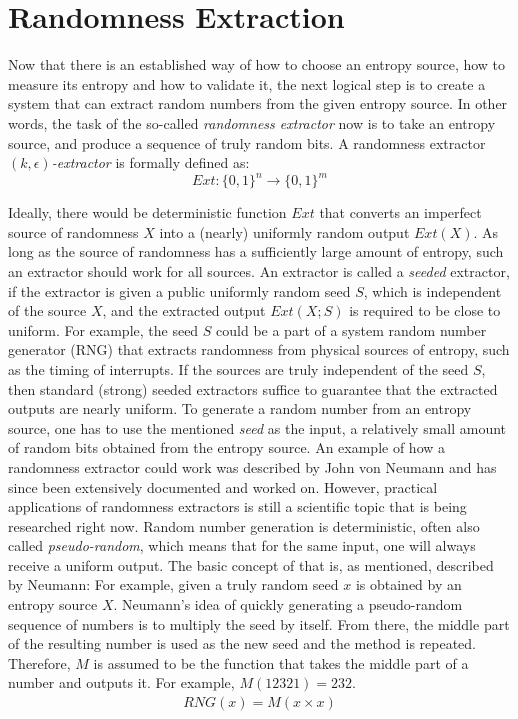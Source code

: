 \section{Randomness Extraction}
Now that there is an established way of how to choose an entropy source, how to measure its entropy and how to validate it, the next logical step is to create a system that can extract random numbers from the given entropy source.
In other words, the task of the so-called \emph{randomness extractor} now is to take an entropy source, and produce a sequence of truly random bits.
\newline
A randomness extractor $(k,\epsilon)$\emph{-extractor} is formally defined as:
\begin{equation}
    Ext: \{0, 1\}^n \to \{0,1\}^m
\end{equation}

\noindent
Ideally, there would be deterministic function $Ext$ that converts an imperfect source of randomness $X$ into a (nearly) uniformly random output $Ext(X)$.
As long as the source of randomness has a sufficiently large amount of entropy, such an extractor should work for all sources.
\newline
An extractor is called a \emph{seeded} extractor, if the extractor is given a public uniformly random seed $S$, which is independent of the source $X$, and the extracted output $Ext(X; S)$ is required to be close to uniform.
For example, the seed $S$ could be a part of a system random number generator (RNG) that extracts randomness from physical sources of entropy, such as the timing of interrupts.
If the sources are truly independent of the seed $S$, then standard (strong) seeded extractors suffice to guarantee that the extracted outputs are nearly uniform\cite{randomness:extractor3}.
\emptyline
To generate a random number from an entropy source, one has to use the mentioned \emph{seed} as the input, a relatively small amount of random bits obtained from the entropy source.
An example of how a randomness extractor could work was described by John von Neumann  and has since been extensively documented and worked on.
However, practical applications of randomness extractors is still a scientific topic that is being researched right now.
\emptyline 
Random number generation is deterministic, often also called \emph{pseudo-random}, which means that for the same input, one will always receive a uniform output.
The basic concept of that is, as mentioned, described by Neumann\cite{randomness:extractor4}:
\emptyline
For example, given a truly random seed $x$ is obtained by an entropy source $X$.
Neumann's idea of quickly generating a pseudo-random sequence of numbers is to multiply the seed by itself. From there, the middle part of the resulting number is used as the new seed and the method is repeated.
\newline
Therefore, $M$ is assumed to be the function that takes the middle part of a number and outputs it. For example, $M(12321) = 232$.
$$
\begin{array}{l}
    RNG(x) = M \left(x \times x\right)
\end{array}
$$

